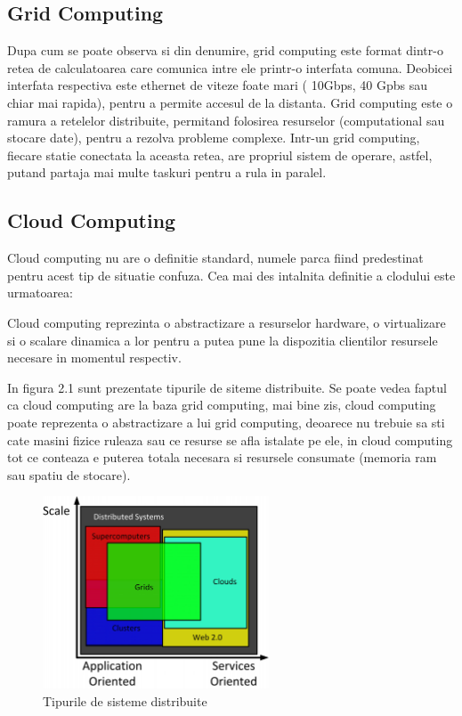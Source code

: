 \subsection{Grid Computing}

Dupa cum se poate observa si din denumire, grid computing este format dintr-o retea de
calculatoarea care comunica intre ele printr-o interfata comuna. Deobicei interfata respectiva este
ethernet de viteze foate mari ( 10Gbps, 40 Gpbs sau chiar mai rapida), pentru a permite accesul de
la distanta. Grid computing este o ramura a retelelor distribuite, permitand folosirea resurselor
(computational sau stocare date), pentru a rezolva probleme complexe. Intr-un grid computing,
fiecare statie conectata la aceasta retea, are propriul sistem de operare, astfel, putand partaja
mai multe taskuri pentru a rula in paralel\cite{zhang2010comparison}.


\subsection{Cloud Computing}

Cloud computing nu are o definitie standard, numele parca fiind predestinat pentru acest tip de
situatie confuza. Cea mai des intalnita definitie a clodului este urmatoarea:

Cloud computing reprezinta o abstractizare a resurselor hardware, o virtualizare si o scalare
dinamica a lor pentru a putea pune la dispozitia clientilor resursele necesare in momentul
respectiv\cite{foster2008cloud}.

In figura 2.1 sunt prezentate tipurile de siteme distribuite. Se poate vedea faptul ca cloud
computing are la baza grid computing, mai bine zis,
cloud computing poate reprezenta o abstractizare a lui grid computing, deoarece nu trebuie sa sti
cate masini fizice ruleaza sau ce resurse se afla istalate pe ele, in cloud computing tot ce
conteaza e puterea totala necesara si resursele consumate (memoria ram sau spatiu de stocare). 


\begin{figure}[ht] \centering
\includegraphics[width=0.6\textwidth]{img/clustergrid.png}
\caption{Tipurile de sisteme distribuite } \end{figure}


